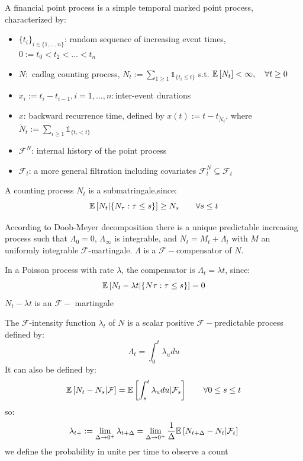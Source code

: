 \begin{mydefinition}
A financial point process is a simple temporal marked point process, characterized by:
\begin{itemize}
	\item $\{t_i\}_{i \in \{1,\ldots,n\}}$: random sequence of increasing event times, $0:=t_0<t_2<\ldots<t_n$
	\item $N:$ cadlag counting process, $N_t := \sum_{1\geq 1} \mathds{1}_{\{t_i \leq t\}}$ s.t. $\mathbb{E}\left[N_t\right] < \infty, \quad \forall t \geq 0$
	\item $x_i:= t_i - t_{i-1}, i=1,\ldots,n:$inter-event durations
	\item $x$: backward recurrence time, defined by $x(t):= t - t_{\breve{N}_t}$, where ${\breve{N}_t}:= \sum_{i \geq 1} \mathds{1}_{\{t_i < t\}}$ 
	\item $\mathcal{F}^N$: internal history of the point process
	\item  $\mathcal{F}_t$: a more general filtration including covariates $\mathcal{F}_t^N \subseteq\mathcal{F}_t$
\end{itemize}
\end{mydefinition}
A counting process $N_t$ is a submatringale,since:
\[
\mathbb{E}\left[N_t| \{N_\tau: \tau \leq s\}\right]\geq N_s \qquad \forall s \leq t
\]
\begin{mydefinition}[Compensator]
According to Doob-Meyer decomposition there is a unique predictable increasing process such that $\Lambda_0=0$, $\Lambda_\infty$ is integrable, and $N_t = M_t + \Lambda_t$  with $M$ an uniformly
integrable $\mathcal{F}$-martingale. $\Lambda$ is a $\mathcal{F}-$compensator of $N$.
\end{mydefinition}
In a Poisson process with rate $\lambda$, the compensator is $\Lambda_t = \lambda t$, since:
\[
\mathbb{E}\left[N_t - \lambda t| \{N\tau: \tau \leq s\}\right] = 0
\] 
$N_t - \lambda t$ is an $\mathcal{F}-$ martingale
\begin{mydefinition}
The $\mathcal{F}$-intensity function $\lambda_t$ of $N$ is a scalar positive $\mathcal{F}-$predictable process defined by:
\[
\Lambda_t = \int_0^t \lambda_udu
\]
It can also be defined by:
\[
\mathbb{E}\left[N_t - N_s|\mathcal{F}\right] = \mathbb{E}\left[\int_s^t \lambda_udu| \mathcal{F}_s\right] \qquad \forall 0\leq s \leq t
\]
so:
\[
\lambda_{t+} := \lim_{\Delta \to 0^+} \lambda_{t + \Delta} = \lim_{\Delta \to 0^+} \frac{1}{\Delta} \mathbb{E}\left[N_{t +\Delta} - N_t| \mathcal{F}_t\right]
\]
we define the probability in unite per time to observe a count
\end{mydefinition}
